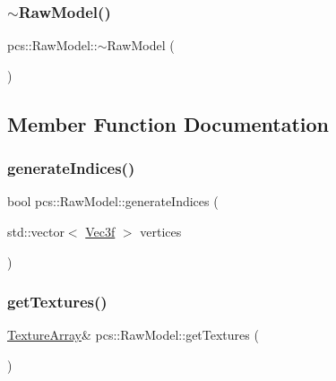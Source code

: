 \mbox{\label{classpcs_1_1RawModel_a3fb7c140b100311f737d23dfb9fbf6d6}} 
\subsubsection{\texorpdfstring{$\sim$\+Raw\+Model()}{~RawModel()}}
{\footnotesize\ttfamily pcs\+::\+Raw\+Model\+::$\sim$\+Raw\+Model (\begin{DoxyParamCaption}{ }\end{DoxyParamCaption})}



\subsection{Member Function Documentation}
\mbox{\label{classpcs_1_1RawModel_a147fb1b196e18e2f2deb1a6e86fff9b6}} 
\subsubsection{\texorpdfstring{generate\+Indices()}{generateIndices()}}
{\footnotesize\ttfamily bool pcs\+::\+Raw\+Model\+::generate\+Indices (\begin{DoxyParamCaption}\item[{std\+::vector$<$ \hyperlink{namespacepcs_a68e0f517680976c17c810ffe6952cbab}{Vec3f} $>$}]{vertices }\end{DoxyParamCaption})}

\mbox{\label{classpcs_1_1RawModel_a3caaf1aa1419660fcd4c33807eb96782}} 
\subsubsection{\texorpdfstring{get\+Textures()}{getTextures()}}
{\footnotesize\ttfamily \hyperlink{unionpcs_1_1TextureArray}{Texture\+Array}\& pcs\+::\+Raw\+Model\+::get\+Textures (\begin{DoxyParamCaption}{ }\end{DoxyParamCaption})\hspace{0.3cm}{\ttfamily [inline]}}

